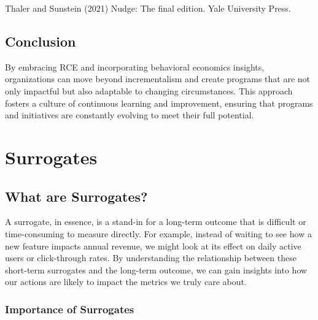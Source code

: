 \documentclass[
  letterpaper,
  DIV=11,
  numbers=noendperiod]{scrreprt}
\begin{document}
\begin{tcolorbox}[enhanced jigsaw, colframe=quarto-callout-tip-color-frame, left=2mm, toprule=.15mm, colbacktitle=quarto-callout-tip-color!10!white, title=\textcolor{quarto-callout-tip-color}{\faLightbulb}\hspace{0.5em}{Learn more}, coltitle=black, rightrule=.15mm, leftrule=.75mm, colback=white, arc=.35mm, bottomtitle=1mm, bottomrule=.15mm, breakable, titlerule=0mm, opacitybacktitle=0.6, toptitle=1mm, opacityback=0]

Thaler and Sunstein (2021) Nudge: The final edition. Yale University
Press.

\end{tcolorbox}

\section{Conclusion}\label{conclusion-1}

By embracing RCE and incorporating behavioral economics insights,
organizations can move beyond incrementalism and create programs that
are not only impactful but also adaptable to changing circumstances.
This approach fosters a culture of continuous learning and improvement,
ensuring that programs and initiatives are constantly evolving to meet
their full potential.

\chapter{Surrogates}\label{surrogates}

\section{What are Surrogates?}\label{what-are-surrogates}

A surrogate, in essence, is a stand-in for a long-term outcome that is
difficult or time-consuming to measure directly. For example, instead of
waiting to see how a new feature impacts annual revenue, we might look
at its effect on daily active users or click-through rates. By
understanding the relationship between these short-term surrogates and
the long-term outcome, we can gain insights into how our actions are
likely to impact the metrics we truly care about.

\subsection{Importance of Surrogates}\label{importance-of-surrogates}
\end{document}
